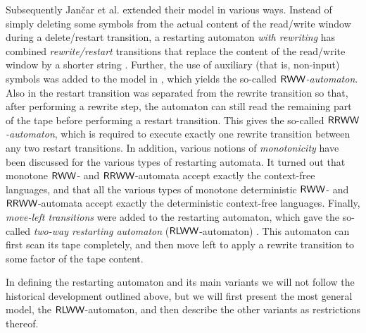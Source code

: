 Subsequently Jančar et al. extended their model in various ways. Instead of simply deleting some symbols from the actual content of the read/write window during a delete/restart transition, a restarting automaton \emph{with rewriting} has combined \emph{rewrite/restart} transitions that replace the content of the read/write window by a shorter string \cite{JMPV97}. Further, the use of auxiliary (that is, non-input) symbols was added to the model in \cite{JMPV98}, which yields the so-called \emph{$\textup{\sf RWW}$-automaton}. Also in \cite{JMPV98} the restart transition was separated from the rewrite transition so that, after performing a rewrite step, the automaton can still read the remaining part of the tape before performing a restart transition. This gives the so-called \emph{$\textup{\sf RRWW}$-automaton}, which is required to execute exactly one rewrite transition between any two restart transitions. In addition, various notions of \emph{monotonicity} have been discussed for the various types of restarting automata. It turned out that monotone $\textup{\sf RWW}$- and $\textup{\sf RRWW}$-automata accept exactly the context-free languages, and that all the various types of monotone deterministic $\textup{\sf RWW}$- and $\textup{\sf RRWW}$-automata accept exactly the deterministic context-free languages. Finally, \emph{move-left transitions} were added to the restarting automaton, which gave the so-called \emph{two-way restarting automaton} ($\textup{\sf RLWW}$-automaton) \cite{P01}. This automaton can first scan its tape completely, and then move left to apply a rewrite transition to some factor of the tape content.

In defining the restarting automaton and its main variants we will not follow the historical development outlined above, but we will first present the most general model, the $\textup{\sf RLWW}$-automaton, and then describe the other variants as restrictions thereof.

